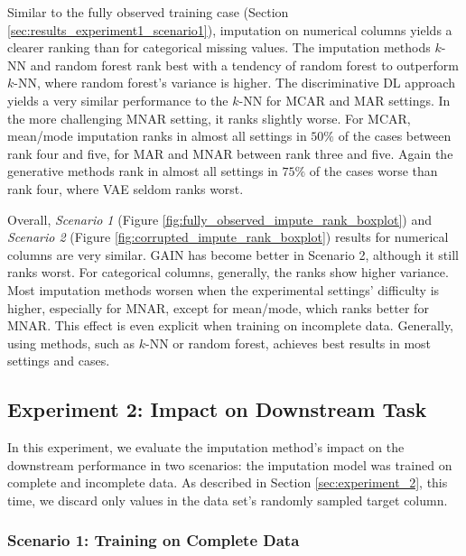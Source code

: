 \documentclass[utf8]{frontiersSCNS} %
\begin{document}
Similar to the fully observed training case (Section \ref{sec:results_experiment1_scenario1}), imputation on numerical columns yields a clearer ranking than for categorical missing values. The imputation methods $k$-NN and random forest rank best with a tendency of random forest to outperform $k$-NN, where random forest's variance is higher. The discriminative DL approach yields a very similar performance to the $k$-NN for MCAR and MAR settings. In the more challenging MNAR setting, it ranks slightly worse. For MCAR, mean/mode imputation ranks in almost all settings in $50\%$ of the cases between rank four and five, for MAR and MNAR between rank three and five. Again the generative methods rank in almost all settings in $75\%$ of the cases worse than rank four, where VAE seldom ranks worst.

Overall, \textit{Scenario 1} (Figure \ref{fig:fully_observed_impute_rank_boxplot}) and \textit{Scenario 2} (Figure \ref{fig:corrupted_impute_rank_boxplot}) results for numerical columns are very similar. GAIN has become better in Scenario 2, although it still ranks worst. For categorical columns, generally, the ranks show higher variance. Most imputation methods worsen when the experimental settings' difficulty is higher, especially for MNAR, except for mean/mode, which ranks better for MNAR. This effect is even explicit when training on incomplete data. Generally, using methods, such as $k$-NN or random forest, achieves best results in most settings and cases.



\subsection{Experiment 2: Impact on Downstream Task}

In this experiment, we evaluate the imputation method's impact on the downstream performance in two scenarios: the imputation model was trained on complete and incomplete data. As described in Section \ref{sec:experiment_2}, this time, we discard only values in the data set's randomly sampled target column.


\subsubsection{Scenario 1: Training on Complete Data}
\end{document}

